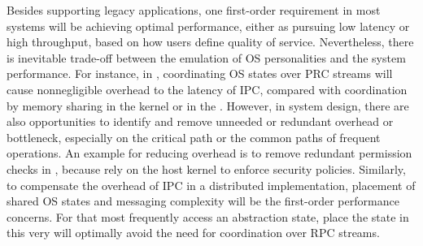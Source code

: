%
%


Besides supporting legacy applications,
one first-order requirement in most systems will be achieving
optimal performance, either as pursuing low latency or high throughput,
based on how users define quality of service.
Nevertheless, there is inevitable trade-off between the emulation of OS personalities
and the system performance.
For instance, in \graphene{}, coordinating OS states %
over PRC streams
will cause nonnegligible overhead to the latency of IPC,
compared with coordination by memory sharing in the kernel or in the \picoprocs{}.
However, in system design,
there are also opportunities to identify and remove unneeded or redundant
overhead or bottleneck,
especially on the critical path or the common paths of
frequent operations.
An example for reducing overhead
is to remove redundant permission checks in \liboses{},
because \picoprocs{} rely on the host kernel to enforce security policies.
Similarly, to compensate the overhead of IPC
in a distributed implementation, placement of shared OS states and messaging complexity
will be the first-order performance concerns.
For \picoprocs{} that most frequently access an abstraction state,
place the state in this very \picoproc{}
will optimally avoid the need for coordination over RPC streams.


